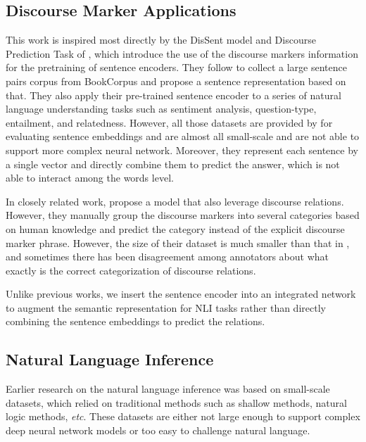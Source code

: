 \documentclass[11pt,letterpaper]{article}
\begin{document}
\subsection{Discourse Marker Applications}
This work is inspired most directly by the DisSent model and Discourse Prediction Task of \citet{nie2017dissent}, which introduce the use of the discourse markers information for the pretraining of sentence encoders. They follow \cite{kiros2015skip} to collect a large sentence pairs corpus from BookCorpus\cite{zhu2015aligning} and propose a sentence representation based on that. They also apply their pre-trained sentence encoder to a series of natural language understanding tasks such as sentiment analysis, question-type, entailment, and relatedness. However, all those datasets are provided by \citet{conneau2017supervised} for evaluating sentence embeddings and are almost all small-scale and are not able to support more complex neural network. Moreover, they represent each sentence by a single vector and directly combine them to predict the answer, which is not able to interact among the words level.

In closely related work, \citet{jernite2017discourse} propose a model that also leverage discourse relations. However, they manually group the discourse markers into several categories based on human knowledge and predict the category instead of the explicit discourse marker phrase. However, the size of their dataset is much smaller than that in 
\cite{nie2017dissent}, and sometimes there has been disagreement among annotators about what exactly is the correct categorization of discourse relations\cite{hobbs1990literature}.

Unlike previous works, we insert the sentence encoder into an integrated network to augment the semantic representation for NLI tasks rather than directly combining the sentence embeddings to predict the relations. 


\subsection{Natural Language Inference}
Earlier research on the natural language inference was based on small-scale datasets\cite{marelli2014sick}, which relied on traditional methods such as shallow methods\cite{glickman2005web}, natural logic methods\cite{maccartney2007natural}, \emph{etc}. These datasets are either not large enough to support complex deep neural network models or too easy to challenge natural language. 
\end{document}
